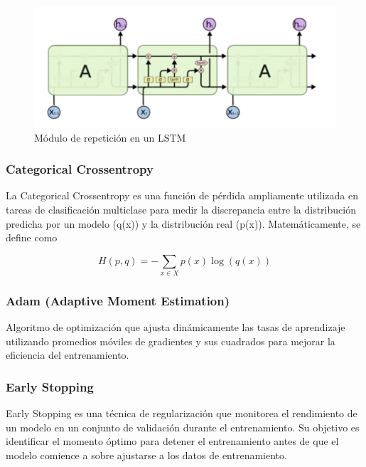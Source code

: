 \documentclass{article}
\begin{document}
\begin{figure}[!hbtp]
    \centering
    \includegraphics[width=5in]{figuras/modRepLSTM.png}
		\caption{Módulo de repetición en un LSTM}
		\label{fig2}
\end{figure}

\subsubsection{Categorical Crossentropy}

La Categorical Crossentropy es una función de pérdida ampliamente utilizada en tareas de clasificación multiclase para medir la discrepancia entre la distribución predicha por un modelo (q(x)) y la distribución real (p(x)). Matemáticamente, se define como

\[
H(p,q) = - \sum_{x \in X} p(x) \log(q(x))
\]

\subsubsection{Adam (Adaptive Moment Estimation)}

Algoritmo de optimización que ajusta dinámicamente las tasas de aprendizaje utilizando promedios móviles de gradientes y sus cuadrados para mejorar la eficiencia del entrenamiento.

\subsubsection{Early Stopping}

Early Stopping es una técnica de regularización que monitorea el rendimiento de un modelo en un conjunto de validación durante el entrenamiento. Su objetivo es identificar el momento óptimo para detener el entrenamiento antes de que el modelo comience a sobre ajustarse a los datos de entrenamiento. 
\end{document}
